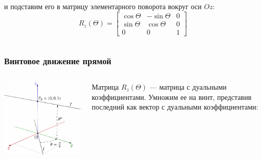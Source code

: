 \begin{frame}
\begin{columns}
\begin{column}{0.6\textwidth}
\begin{equation*}
      \end{equation*}
      и подставим его в матрицу элементарного поворота вокруг оси $Oz$:
      \begin{equation*}
        R_{z}(\Theta) = 
        \begin{bmatrix}
          \cos\Theta & -\sin\Theta & 0\\
          \sin\Theta & \cos\Theta & 0\\
          0 & 0 & 1
        \end{bmatrix}
      \end{equation*}
    \end{column}
  \end{columns}
\end{frame}

\begin{frame}
  \frametitle{Винтовое движение прямой}
  \begin{columns}
    \begin{column}{0.4\textwidth}
      \begin{center}
        \includegraphics[width=\textwidth]{img/screws/moment07}
      \end{center}
    \end{column}
    \begin{column}{0.6\textwidth}
      Матрица $R_{z}(\Theta)$ — матрица с дуальными коэффициентами. Умножим ее на винт, представив последний как вектор с дуальными коэффициентами:

\end{column}
\end{columns}
\end{frame}

